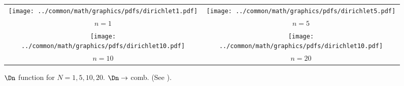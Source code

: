 \begin{figure}
  \centering
  \begin{tabular}{cc}
    \texttt{[image: ../common/math/graphics/pdfs/dirichlet1.pdf]}&\texttt{[image: ../common/math/graphics/pdfs/dirichlet5.pdf]}\\
    $n=1$&$n=5$\\
    \texttt{[image: ../common/math/graphics/pdfs/dirichlet10.pdf]}&\texttt{[image: ../common/math/graphics/pdfs/dirichlet10.pdf]}\\
    $n=10$&$n=20$
  \end{tabular}
    \caption{
       $\Dn$ function for $N=1,5,10,20$.
       $\Dn\to$ comb.
       (See ).
       \label{fig:DN}
       }
\end{figure}
%
